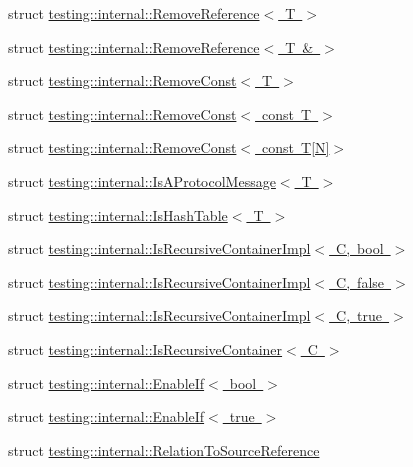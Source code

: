 \begin{DoxyCompactItemize}
struct \mbox{\hyperlink{structtesting_1_1internal_1_1_remove_reference}{testing\+::internal\+::\+Remove\+Reference$<$ T $>$}}
\item 
struct \mbox{\hyperlink{structtesting_1_1internal_1_1_remove_reference_3_01_t_01_6_01_4}{testing\+::internal\+::\+Remove\+Reference$<$ T \& $>$}}
\item 
struct \mbox{\hyperlink{structtesting_1_1internal_1_1_remove_const}{testing\+::internal\+::\+Remove\+Const$<$ T $>$}}
\item 
struct \mbox{\hyperlink{structtesting_1_1internal_1_1_remove_const_3_01const_01_t_01_4}{testing\+::internal\+::\+Remove\+Const$<$ const T $>$}}
\item 
struct \mbox{\hyperlink{structtesting_1_1internal_1_1_remove_const_3_01const_01_t[_n]_4}{testing\+::internal\+::\+Remove\+Const$<$ const T\mbox{[}\+N\mbox{]}$>$}}
\item 
struct \mbox{\hyperlink{structtesting_1_1internal_1_1_is_a_protocol_message}{testing\+::internal\+::\+Is\+A\+Protocol\+Message$<$ T $>$}}
\item 
struct \mbox{\hyperlink{structtesting_1_1internal_1_1_is_hash_table}{testing\+::internal\+::\+Is\+Hash\+Table$<$ T $>$}}
\item 
struct \mbox{\hyperlink{structtesting_1_1internal_1_1_is_recursive_container_impl}{testing\+::internal\+::\+Is\+Recursive\+Container\+Impl$<$ C, bool $>$}}
\item 
struct \mbox{\hyperlink{structtesting_1_1internal_1_1_is_recursive_container_impl_3_01_c_00_01false_01_4}{testing\+::internal\+::\+Is\+Recursive\+Container\+Impl$<$ C, false $>$}}
\item 
struct \mbox{\hyperlink{structtesting_1_1internal_1_1_is_recursive_container_impl_3_01_c_00_01true_01_4}{testing\+::internal\+::\+Is\+Recursive\+Container\+Impl$<$ C, true $>$}}
\item 
struct \mbox{\hyperlink{structtesting_1_1internal_1_1_is_recursive_container}{testing\+::internal\+::\+Is\+Recursive\+Container$<$ C $>$}}
\item 
struct \mbox{\hyperlink{structtesting_1_1internal_1_1_enable_if}{testing\+::internal\+::\+Enable\+If$<$ bool $>$}}
\item 
struct \mbox{\hyperlink{structtesting_1_1internal_1_1_enable_if_3_01true_01_4}{testing\+::internal\+::\+Enable\+If$<$ true $>$}}
\item 
struct \mbox{\hyperlink{structtesting_1_1internal_1_1_relation_to_source_reference}{testing\+::internal\+::\+Relation\+To\+Source\+Reference}}

\end{DoxyCompactItemize}
